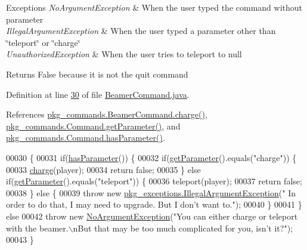 \begin{DoxyExceptions}{Exceptions}
{\em No\-Argument\-Exception} & When the user typed the command without parameter \\
\hline
{\em Illegal\-Argument\-Exception} & When the user typed a parameter other than \char`\"{}teleport\char`\"{} or \char`\"{}charge\char`\"{} \\
\hline
{\em Unauthorized\-Exception} & When the user tries to teleport to null \\
\hline
\end{DoxyExceptions}
\begin{DoxyReturn}{Returns}
False because it is not the quit command 
\end{DoxyReturn}


Definition at line \hyperlink{BeamerCommand_8java_source_l00030}{30} of file \hyperlink{BeamerCommand_8java_source}{Beamer\-Command.\-java}.



References \hyperlink{BeamerCommand_8java_source_l00067}{pkg\-\_\-commands.\-Beamer\-Command.\-charge()}, \hyperlink{Command_8java_source_l00041}{pkg\-\_\-commands.\-Command.\-get\-Parameter()}, and \hyperlink{Command_8java_source_l00073}{pkg\-\_\-commands.\-Command.\-has\-Parameter()}.


\begin{DoxyCode}
00030                                                                                                            
                              \{
00031         \textcolor{keywordflow}{if}(\hyperlink{classpkg__commands_1_1Command_a02af95ab3f1898a66259ab7c177b6998}{hasParameter}()) \{
00032             \textcolor{keywordflow}{if}(\hyperlink{classpkg__commands_1_1Command_a41c92d445be73ea9d62320c65efb8434}{getParameter}().equals(\textcolor{stringliteral}{"charge"})) \{
00033                 \hyperlink{classpkg__commands_1_1BeamerCommand_ae71665296a18d581ad1f714c1078e37b}{charge}(player);
00034                 \textcolor{keywordflow}{return} \textcolor{keyword}{false};
00035             \} \textcolor{keywordflow}{else} \textcolor{keywordflow}{if}(\hyperlink{classpkg__commands_1_1Command_a41c92d445be73ea9d62320c65efb8434}{getParameter}().equals(\textcolor{stringliteral}{"teleport"})) \{
00036                 teleport(player);
00037                 \textcolor{keywordflow}{return} \textcolor{keyword}{false};
00038             \} \textcolor{keywordflow}{else} \{
00039                 \textcolor{keywordflow}{throw} \textcolor{keyword}{new} \hyperlink{classpkg__exceptions_1_1IllegalArgumentException}{pkg\_exceptions.IllegalArgumentException}(\textcolor{stringliteral}{"
      In order to do that, I may need to upgrade. But I don't want to."});
00040             \}
00041         \} \textcolor{keywordflow}{else} 
00042             \textcolor{keywordflow}{throw} \textcolor{keyword}{new} \hyperlink{classpkg__exceptions_1_1NoArgumentException}{NoArgumentException}(\textcolor{stringliteral}{"You can either charge or teleport with the
       beamer.\(\backslash\)nBut that may be too much complicated for you, isn't it?"});
00043     \}
\end{DoxyCode}


